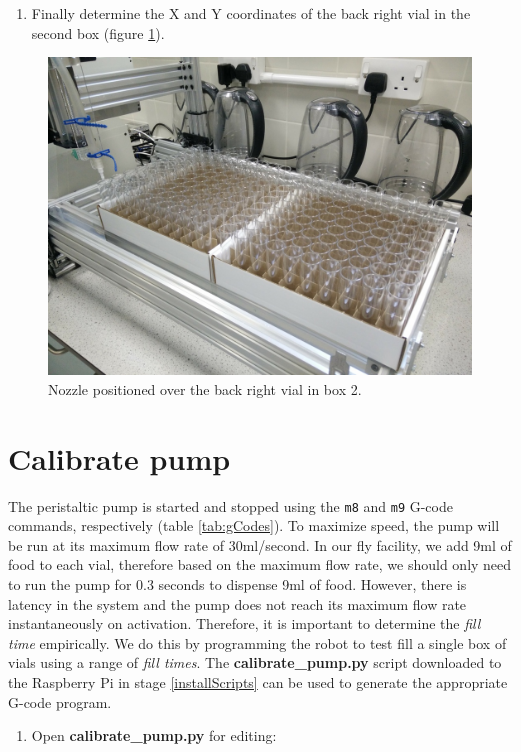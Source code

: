 \documentclass[
]{book}
\providecommand{\tightlist}{%
  \setlength{\itemsep}{0pt}\setlength{\parskip}{0pt}}
\begin{document}
\begin{enumerate}
\def\labelenumi{\arabic{enumi}.}
\setcounter{enumi}{6}
\tightlist
\item
  Finally determine the X and Y coordinates of the back right vial in the second box (figure \ref{fig:box2BackRight}).
\end{enumerate}

\begin{figure}

{\centering \includegraphics[width=0.5\linewidth]{images/box2_last_vial} 

}

\caption{Nozzle positioned over the back right vial in box 2.}\label{fig:box2BackRight}
\end{figure}

\hypertarget{calibratePump}{%
\section{Calibrate pump}\label{calibratePump}}

The peristaltic pump is started and stopped using the \texttt{m8} and \texttt{m9} G-code commands, respectively (table \ref{tab:gCodes}). To maximize speed, the pump will be run at its maximum flow rate of 30ml/second. In our fly facility, we add 9ml of food to each vial, therefore based on the maximum flow rate, we should only need to run the pump for 0.3 seconds to dispense 9ml of food. However, there is latency in the system and the pump does not reach its maximum flow rate instantaneously on activation. Therefore, it is important to determine the \emph{fill time} empirically. We do this by programming the robot to test fill a single box of vials using a range of \emph{fill times}. The \textbf{calibrate\_pump.py} script downloaded to the Raspberry Pi in stage \ref{installScripts} can be used to generate the appropriate G-code program.

\begin{enumerate}
\def\labelenumi{\arabic{enumi}.}
\tightlist
\item
  Open \textbf{calibrate\_pump.py} for editing:
\end{enumerate}
\end{document}
